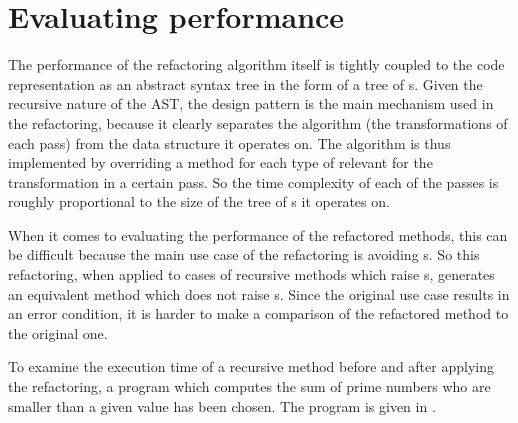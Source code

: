 \chapter{Evaluating performance}

The performance of the refactoring algorithm itself is tightly coupled to the code representation as an abstract syntax
tree in the form of a tree of s. Given the recursive nature of the AST,
the  design pattern is the main mechanism used in the refactoring, because it clearly separates the algorithm
(the transformations of each pass) from the data structure it operates on. The algorithm is thus implemented by
overriding a method for each type of relevant  for the transformation in a certain pass. So the time
complexity of each of the passes is roughly proportional to the size of the tree of s it operates on.

When it comes to evaluating the performance of the refactored methods, this can be difficult because the main use case
of the refactoring is avoiding s. So this refactoring, when applied to cases of recursive
methods which raise s, generates an equivalent method which does not raise
s. Since the original use case results in an error condition, it is harder to make a
comparison of the refactored method to the original one.

To examine the execution time of a recursive method before and after applying the refactoring, a program which computes
the sum of prime numbers who are smaller than a given value has been chosen. The program is given in
.

